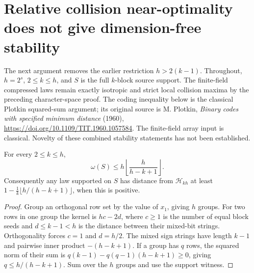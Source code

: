 \section{Relative collision near-optimality does not give dimension-free stability}
\label{sec:design-relative-stability}
The next argument removes the earlier restriction $h>2(k-1)$.
Throughout, $h=2^s$, $2\le k\le h$, and $S$ is the full $k$-block source
support. The finite-field compressed laws remain exactly isotropic and
strict local collision maxima by the preceding character-space proof.
The coding inequality below is the classical Plotkin squared-sum argument;
its original source is M. Plotkin, \emph{Binary codes with specified
minimum distance} (1960), \url{https://doi.org/10.1109/TIT.1960.1057584}.
The finite-field array input is classical. Novelty of these combined
stability statements has not been established.

\begin{proposition}
\label{prop:design-plotkin-support}
For every $2\le k\le h$,
\[
 \omega(S)\le h\left\lfloor\frac{h}{h-k+1}\right\rfloor.
\]
Consequently any law supported on $S$ has distance from $\mathcal H_{kh}$
at least
$1-\frac1k\lfloor h/(h-k+1)\rfloor$, when this is positive.
\end{proposition}
\begin{proof}
Group an orthogonal row set by the value of $x_1$, giving $h$ groups.
For two rows in one group the kernel is $h c-2d$, where $c\ge1$ is
the number of equal block seeds and $d\le k-1<h$ is the distance
between their mixed-bit strings. Orthogonality forces $c=1$ and
$d=h/2$. The mixed sign strings have length $k-1$ and pairwise inner
product $-(h-k+1)$. If a group has $q$ rows, the squared norm of their
sum is $q(k-1)-q(q-1)(h-k+1)\ge0$, giving
$q\le h/(h-k+1)$. Sum over the $h$ groups and use the support witness.
\end{proof}

